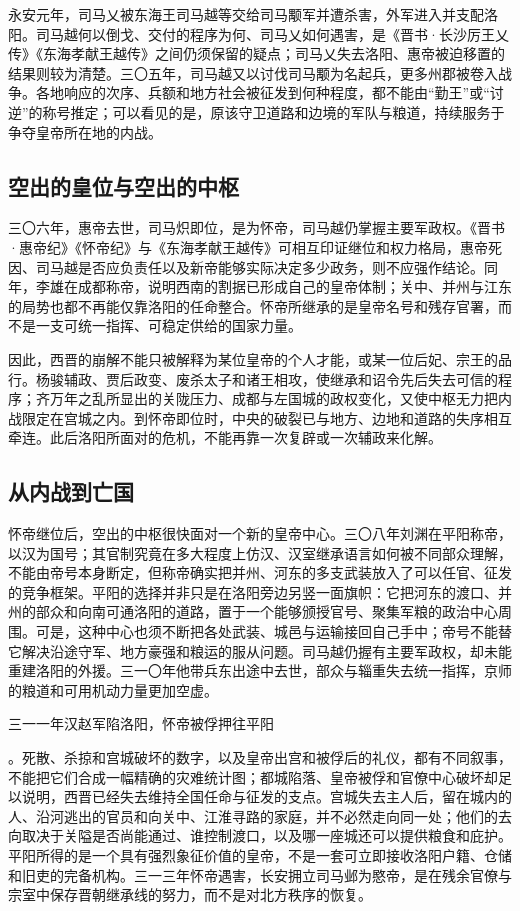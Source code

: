 永安元年，司马乂被东海王司马越等交给司马颙军并遭杀害，外军进入并支配洛阳。司马越何以倒戈、交付的程序为何、司马乂如何遇害，是《晋书·长沙厉王乂传》《东海孝献王越传》之间仍须保留的疑点；司马乂失去洛阳、惠帝被迫移置的结果则较为清楚。三〇五年，司马越又以讨伐司马颙为名起兵，更多州郡被卷入战争。各地响应的次序、兵额和地方社会被征发到何种程度，都不能由“勤王”或“讨逆”的称号推定；可以看见的是，原该守卫道路和边境的军队与粮道，持续服务于争夺皇帝所在地的内战。

\subsection{空出的皇位与空出的中枢}

三〇六年，惠帝去世，司马炽即位，是为怀帝，司马越仍掌握主要军政权。《晋书·惠帝纪》《怀帝纪》与《东海孝献王越传》可相互印证继位和权力格局，惠帝死因、司马越是否应负责任以及新帝能够实际决定多少政务，则不应强作结论。同年，李雄在成都称帝，说明西南的割据已形成自己的皇帝体制；关中、并州与江东的局势也都不再能仅靠洛阳的任命整合。怀帝所继承的是皇帝名号和残存官署，而不是一支可统一指挥、可稳定供给的国家力量。

因此，西晋的崩解不能只被解释为某位皇帝的个人才能，或某一位后妃、宗王的品行。杨骏辅政、贾后政变、废杀太子和诸王相攻，使继承和诏令先后失去可信的程序；齐万年之乱所显出的关陇压力、成都与左国城的政权变化，又使中枢无力把内战限定在宫城之内。到怀帝即位时，中央的破裂已与地方、边地和道路的失序相互牵连。此后洛阳所面对的危机，不能再靠一次复辟或一次辅政来化解。

\subsection{从内战到亡国}

怀帝继位后，空出的中枢很快面对一个新的皇帝中心。\hypertarget{evt:JH-0308-LIU-YUAN-EMPEROR}{\textcolor{dynasty}{三〇八年刘渊在平阳称帝，以汉为国号}}；其官制究竟在多大程度上仿汉、汉室继承语言如何被不同部众理解，不能由帝号本身断定，但称帝确实把并州、河东的多支武装放入了可以任官、征发的竞争框架。平阳的选择并非只是在洛阳旁边另竖一面旗帜：它把河东的渡口、并州的部众和向南可通洛阳的道路，置于一个能够颁授官号、聚集军粮的政治中心周围。可是，这种中心也须不断把各处武装、城邑与运输接回自己手中；帝号不能替它解决沿途守军、地方豪强和粮运的服从问题。司马越仍握有主要军政权，却未能重建洛阳的外援。三一〇年他带兵东出途中去世，部众与辎重失去统一指挥，京师的粮道和可用机动力量更加空虚。

\hypertarget{evt:JH-0311-HUAI-EMPEROR-CAPTURED}{\textcolor{dynasty}{三一一年汉赵军陷洛阳，怀帝被俘押往平阳}}。死散、杀掠和宫城破坏的数字，以及皇帝出宫和被俘后的礼仪，都有不同叙事，不能把它们合成一幅精确的灾难统计图；都城陷落、皇帝被俘和官僚中心破坏却足以说明，西晋已经失去维持全国任命与征发的支点。宫城失去主人后，留在城内的人、沿河逃出的官员和向关中、江淮寻路的家庭，并不必然走向同一处；他们的去向取决于关隘是否尚能通过、谁控制渡口，以及哪一座城还可以提供粮食和庇护。平阳所得的是一个具有强烈象征价值的皇帝，不是一套可立即接收洛阳户籍、仓储和旧吏的完备机构。三一三年怀帝遇害，长安拥立司马邺为愍帝，是在残余官僚与宗室中保存晋朝继承线的努力，而不是对北方秩序的恢复。

